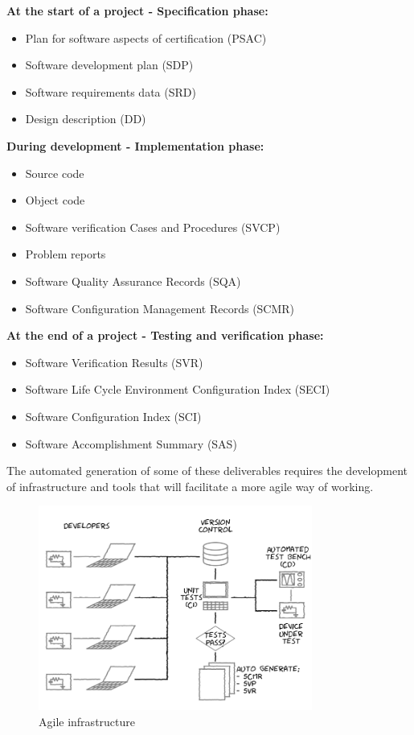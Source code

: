 \documentclass[conference]{IEEEtran}
\begin{document}
\textbf{At the start of a project - Specification phase:}

\begin{itemize}
\item Plan for software aspects of certification (PSAC)
\item Software development plan (SDP)
\item Software requirements data (SRD)
\item Design description (DD)
\end{itemize}

\textbf{During development - Implementation phase:}

\begin{itemize}
\item Source code
\item Object code
\item Software verification Cases and Procedures (SVCP)
\item Problem reports
\item Software Quality Assurance Records (SQA)
\item Software Configuration Management Records (SCMR)
\end{itemize}

\textbf{At the end of a project - Testing and verification phase:}

\begin{itemize}
\item Software Verification Results (SVR)
\item Software Life Cycle Environment Configuration Index (SECI)
\item Software Configuration Index (SCI)
\item Software Accomplishment Summary (SAS)
\end{itemize} 

The automated generation of some of these deliverables requires the development of infrastructure and tools that will facilitate a more agile way of working.

\begin{figure}[t!]
\centering 
\includegraphics[width=90mm]{agile_setup.png}
\caption{Agile infrastructure}
\end{figure}
\end{document}
